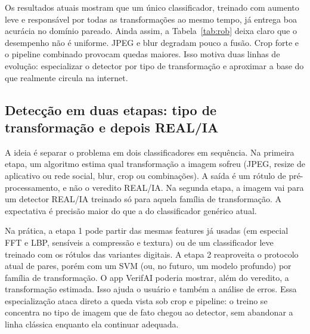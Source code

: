 \documentclass[12pt]{article}
\begin{document}
Os resultados atuais mostram que um único classificador, treinado com aumento leve e responsável por todas as transformações ao mesmo tempo, já entrega boa acurácia no domínio pareado. Ainda assim, a Tabela~\ref{tab:rob} deixa claro que o desempenho não é uniforme. JPEG e blur degradam pouco a fusão. Crop forte e o pipeline combinado provocam quedas maiores. Isso motiva duas linhas de evolução: especializar o detector por tipo de transformação e aproximar a base do que realmente circula na internet.

\subsection{Detecção em duas etapas: tipo de transformação e depois REAL/IA}

A ideia é separar o problema em dois classificadores em sequência. Na primeira etapa, um algoritmo estima qual transformação a imagem sofreu (JPEG, resize de aplicativo ou rede social, blur, crop ou combinações). A saída é um rótulo de pré-processamento, e não o veredito REAL/IA. Na segunda etapa, a imagem vai para um detector REAL/IA treinado só para aquela família de transformação. A expectativa é precisão maior do que a do classificador genérico atual.

Na prática, a etapa 1 pode partir das mesmas features já usadas (em especial FFT e LBP, sensíveis a compressão e textura) ou de um classificador leve treinado com os rótulos das variantes digitais. A etapa 2 reaproveita o protocolo atual de pares, porém com um SVM (ou, no futuro, um modelo profundo) por família de transformação. O app VerifAI poderia mostrar, além do veredito, a transformação estimada. Isso ajuda o usuário e também a análise de erros. Essa especialização ataca direto a queda vista sob crop e pipeline: o treino se concentra no tipo de imagem que de fato chegou ao detector, sem abandonar a linha clássica enquanto ela continuar adequada.
\end{document}
